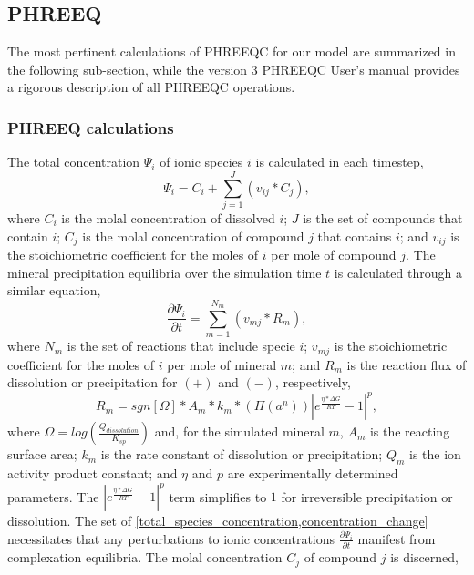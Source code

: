 \begin{supplementary}
\subsection{PHREEQ}
The most pertinent calculations of PHREEQC for our model are summarized in the following sub-section, while the version 3 PHREEQC User's manual provides a rigorous description of all PHREEQC operations.

\subsubsection{PHREEQ calculations}
The total concentration $\Psi_i$ of ionic species $i$ is calculated in each timestep, 
\begin{equation} \label{total_species_concentration}
    \Psi_i=C_i+\sum_{j=1}^{J}(v_{ij}*C_j),
\end{equation}
where $C_i$ is the molal concentration of dissolved $i$; $J$ is the set of compounds that contain $i$; $C_j$ is the molal concentration of compound $j$ that contains $i$; and $v_{ij}$ is the stoichiometric coefficient for the moles of $i$ per mole of compound $j$. The mineral precipitation equilibria over the simulation time $t$ is calculated through a similar equation, 
\begin{equation} \label{concentration_change}
    \frac{\partial \Psi_i}{\partial t}=\sum_{m=1}^{N_m}(v_{mj}*R_m),
\end{equation}
where $N_m$ is the set of reactions that include specie $i$; $v_{mj}$ is the stoichiometric coefficient for the moles of $i$ per mole of mineral $m$; and $R_m$ is the reaction flux of dissolution or precipitation for $(+)$ and $(-)$, respectively,
\begin{equation} \label{mineral_precipitation_reaction}
    R_m=sgn[\Omega]*A_m*k_m*(\Pi(a^n)) |e^{\frac{\eta*\Delta G}{RT}}-1|^p,
\end{equation}
where $\Omega = log\left(⁡\frac{Q_{dissolution}}{K_{sp}}\right)$ and, for the simulated mineral $m$, $A_m$ is the reacting surface area; $k_m$ is the rate constant of dissolution or precipitation; $Q_m$ is the ion activity product constant; and $\eta$ and $p$ are experimentally determined parameters. The $|e^{\frac{\eta * \Delta G}{RT}}-1|^p$ term simplifies to $1$ for irreversible precipitation or dissolution. The set of \cref{total_species_concentration,concentration_change} necessitates that any perturbations to ionic concentrations $\frac{\partial \Psi_i}{\partial t}$ manifest from complexation equilibria. The molal concentration $C_j$ of compound $j$ is discerned,

\end{supplementary}
